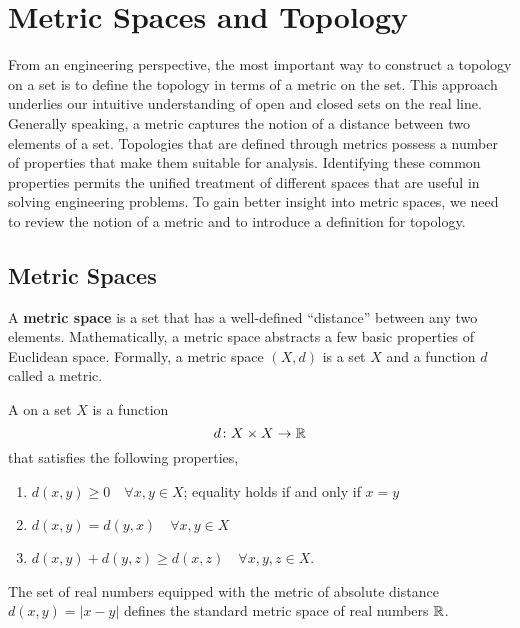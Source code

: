 \chapter{Metric Spaces and Topology}

From an engineering perspective, the most important way to construct a topology on a set is to define the topology in terms of a metric on the set.
This approach underlies our intuitive understanding of open and closed sets on the real line.
Generally speaking, a metric captures the notion of a distance between two elements of a set.
Topologies that are defined through metrics possess a number of properties that make them suitable for analysis.
Identifying these common properties permits the unified treatment of different spaces that are useful in solving engineering problems.
To gain better insight into metric spaces, we need to review the notion of a metric and to introduce a definition for topology.


\section{Metric Spaces}

A \textbf{metric space} is a set that has a well-defined ``distance'' between any two elements.
Mathematically, a metric space abstracts a few basic properties of Euclidean space.
Formally, a metric space $(X,d)$ is a set $X$ and a function $d$ called a metric.
\begin{definition}
A  on a set $X$ is a function
\begin{equation*}
d \colon X \times X \rightarrow \mathbb{R}
\end{equation*}
that satisfies the following properties,
\begin{enumerate}
\item $d(x,y) \geq 0 \quad \forall x, y \in X$; equality holds if and only if $x = y$
\item $d(x,y) = d(y,x) \quad \forall x, y \in X$
\item $d(x,y) + d(y,z) \geq d(x,z) \quad \forall x, y, z \in X$.
\end{enumerate}
\end{definition}

\begin{example}
The set of real numbers equipped with the metric of absolute distance $d(x,y)=\left| x-y \right|$ defines the standard metric space of real numbers $\mathbb{R}$.
\end{example}


